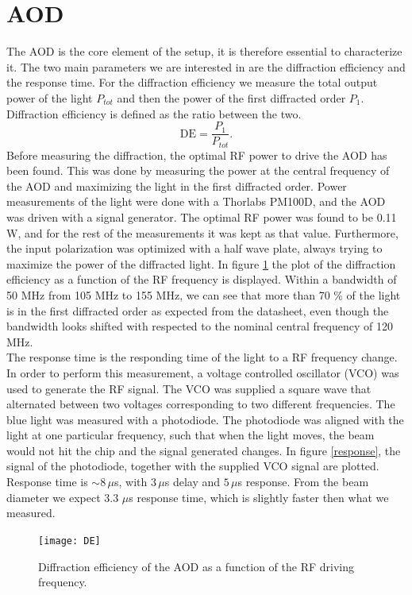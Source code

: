 \section{AOD}
\label{sec:resultaod}
The AOD is the core element of the setup, it is therefore essential to characterize it. The two main parameters we are interested in are the diffraction efficiency and the response time. For the diffraction efficiency we measure the total output power of the light $P_{tot}$ and then the power of the first diffracted order $P_{1}$. Diffraction efficiency is defined as the ratio between the two.
\begin{equation}
\text{DE} = \frac{P_1}{P_{tot}}.
\end{equation}
Before measuring the diffraction, the optimal RF power to drive the AOD has been found. This was done by measuring the power at the central frequency of the AOD and maximizing the light in the first diffracted order. Power measurements of the light were done with a Thorlabs PM100D, and the AOD was driven with a signal generator. The optimal RF power was found to be 0.11 W, and for the rest of the measurements it was kept as that value. Furthermore, the input polarization was optimized with a half wave plate, always trying to maximize the power of the diffracted light. In figure \ref{DE} the plot of the diffraction efficiency as a function of the RF frequency is displayed. Within a bandwidth of 50 MHz from 105 MHz to 155 MHz, we can see that more than 70 \% of the light is in the first diffracted order as expected from the datasheet, even though the bandwidth looks shifted with respected to the nominal central frequency of 120 MHz.\\
The response time is the responding time of the light to a RF frequency change. In order to perform this measurement, a voltage controlled oscillator (VCO) was used to generate the RF signal. The VCO was supplied a square wave that alternated between two voltages corresponding to two different frequencies. The blue light was measured with a photodiode. The photodiode was aligned with the light at one particular frequency, such that when the light moves, the beam would not hit the chip and the signal generated changes. In figure \ref{response}, the signal of the photodiode, together with the supplied VCO signal are plotted. Response time is $\sim 8\,\mu$s, with $3\,\mu$s delay and $5\,\mu$s response. From the beam diameter we expect 3.3 $\mu$s response time, which is slightly faster then what we measured.

\begin{figure}
\centering
\texttt{[image: DE]}
\caption{Diffraction efficiency of the AOD as a function of the RF driving frequency.}
\label{DE}
\end{figure}

